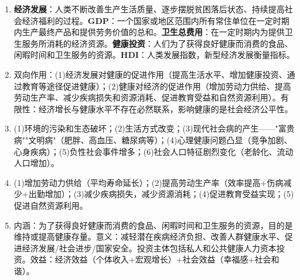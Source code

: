 \begin{enumerate}[leftmargin=*, itemsep=5pt]
    \item \textbf{经济发展}：人类不断改善生产生活质量、逐步摆脱贫困落后状态、持续提高社会经济福利的过程。\textbf{GDP}：一个国家或地区范围内所有常住单位在一定时期内生产最终产品和提供劳务价值的总和。\textbf{卫生总费用}：在一定时期内为提供卫生服务所消耗的经济资源。\textbf{健康投资}：人们为了获得良好健康而消费的食品、闲暇时间和卫生服务的资源。\textbf{HDI}：人类发展指数，新型经济发展衡量指标。
    \item 双向作用：(1)经济发展对健康的促进作用（提高生活水平、增加健康投资、通过教育等途径促进健康）；(2)健康对经济的促进作用（增加劳动力供给、提高劳动生产率、减少疾病损失和资源消耗、促进教育受益和自然资源利用）。有限性：经济增长与健康水平不存在必然联系，影响健康的是社会经济公平性。
    \item (1)环境的污染和生态破坏；(2)生活方式改变；(3)现代社会病的产生——"富贵病""文明病"（肥胖、高血压、糖尿病等）；(4)心理健康问题凸显（竞争加剧、心身疾病）；(5)负性社会事件增多；(6)社会人口特征剧烈变化（老龄化、流动人口增加）。
    \item (1)增加劳动力供给（平均寿命延长）；(2)提高劳动生产率（效率提高+伤病减少+出勤增加）；(3)减少疾病损失，减少资源消耗；(4)促进教育受益实现；(5)促进自然资源利用。
    \item 内涵：为了获得良好健康而消费的食品、闲暇时间和卫生服务的资源，目的是维持或提高健康存量。意义：减轻潜在疾病经济负担、改善人群健康水平、促进经济发展/社会进步/国家安全。投资主体包括私人和公共健康人力资本投资。效益：经济效益（个体收入+宏观增长）+社会效益（幸福感+社会和谐）。
\end{enumerate}

\newpage
